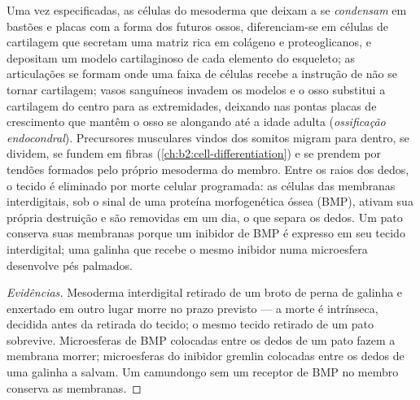 \begin{proposition}\label{prop:b2:limb-organogenesis:skeleton}
Uma vez especificadas, as células do mesoderma que deixam a  se \emph{condensam} em bastões e placas com a forma dos
futuros ossos, diferenciam-se em células de cartilagem que secretam uma
matriz rica em colágeno e proteoglicanos, e depositam um modelo
cartilaginoso de cada elemento do esqueleto; as articulações se formam
onde uma faixa de células recebe a instrução de não se tornar
cartilagem; vasos sanguíneos invadem os modelos e o osso substitui a
cartilagem do centro para as extremidades, deixando nas pontas placas
de crescimento que mantêm o osso se alongando até a idade adulta
(\emph{ossificação endocondral}). Precursores musculares vindos dos
somitos migram para dentro, se dividem, se fundem em fibras
(\cref{ch:b2:cell-differentiation}) e se prendem por tendões formados pelo próprio mesoderma do
membro. Entre os raios dos dedos, o tecido é eliminado por morte
celular programada: as células das membranas interdigitais, sob o sinal
de uma proteína morfogenética óssea (BMP), ativam sua própria
destruição e são removidas em um dia, o que separa os dedos. Um pato
conserva suas membranas porque um inibidor de BMP é expresso em seu
tecido interdigital; uma galinha que recebe o mesmo inibidor numa
microesfera desenvolve pés palmados.
\end{proposition}
\begin{proof}[Evidências]
Mesoderma interdigital retirado de um broto de perna de galinha e
enxertado em outro lugar morre no prazo previsto --- a morte é
intrínseca, decidida antes da retirada do tecido; o mesmo tecido
retirado de um pato sobrevive. Microesferas de BMP colocadas entre os
dedos de um pato fazem a membrana morrer; microesferas do inibidor
gremlin colocadas entre os dedos de uma galinha a salvam. Um
camundongo sem um receptor de BMP no membro conserva as membranas.
\end{proof}

